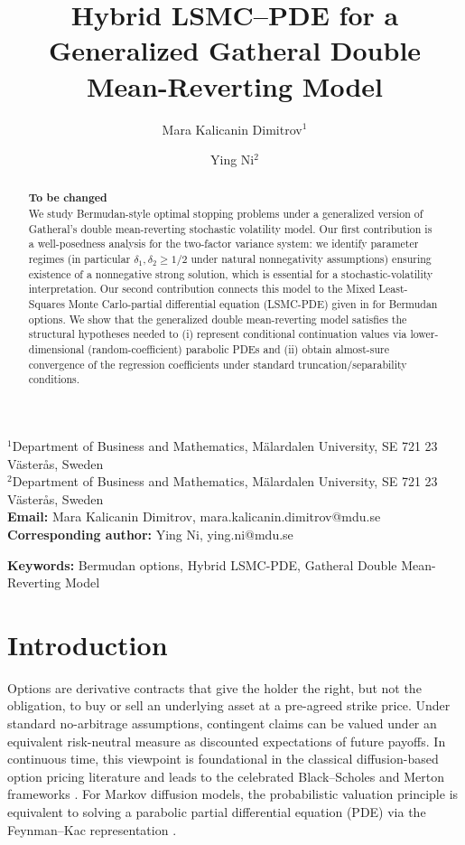 \documentclass[10pt]{article}
\title{Hybrid LSMC--PDE for a Generalized Gatheral Double Mean-Reverting Model}
\author{%
Mara Kalicanin Dimitrov$^{1}$ \and
Ying Ni$^{2}$%
}
\date{}
\theoremstyle{plain}
\theoremstyle{definition}
\theoremstyle{remark}
\newcommand{\keywords}[1]{\par\noindent\textbf{Keywords:} #1\par}
\begin{document}
\maketitle

\begin{center}
\small
$^{1}$Department of Business and Mathematics, M\"{a}lardalen University, SE 721 23 V\"{a}ster{\aa}s, Sweden\\
$^{2}$Department of Business and Mathematics, M\"{a}lardalen University, SE 721 23 V\"{a}ster{\aa}s, Sweden\\[4pt]
\textbf{Email:} Mara Kalicanin Dimitrov, mara.kalicanin.dimitrov@mdu.se\\
\textbf{Corresponding author:} Ying Ni, ying.ni@mdu.se\\
\end{center}

\begin{abstract}
\textbf{To be changed}\\
We study Bermudan-style optimal stopping problems under a generalized version of Gatheral's
double mean-reverting stochastic volatility model. Our first contribution is a well-posedness analysis for the
two-factor variance system: we identify parameter regimes (in particular $\delta_1,\delta_2\ge 1/2$
under natural nonnegativity assumptions) ensuring existence of a nonnegative strong solution,
which is essential for a stochastic-volatility interpretation.
Our second contribution connects this model to the Mixed Least-Squares Monte Carlo-partial
differential equation (LSMC-PDE) given in \citet{farahany2020mixing} for Bermudan
options. We show that the generalized double
mean-reverting model satisfies the structural hypotheses needed to (i) represent conditional
continuation values via lower-dimensional (random-coefficient) parabolic PDEs and (ii) obtain
almost-sure convergence of the regression coefficients under standard truncation/separability
conditions.
\end{abstract}

\keywords{Bermudan options, Hybrid LSMC-PDE, Gatheral Double Mean-Reverting Model}


\section{Introduction}

Options are derivative contracts that give the holder the right, but not the obligation, to buy or sell an underlying asset at a pre-agreed strike price.
Under standard no-arbitrage assumptions, contingent claims can be valued under an equivalent risk-neutral measure as discounted expectations of future payoffs.
In continuous time, this viewpoint is foundational in the classical diffusion-based option pricing literature and leads to the celebrated Black--Scholes and Merton frameworks \citep{black1973pricing,merton1973theory}.
For Markov diffusion models, the probabilistic valuation principle is equivalent to solving a parabolic partial differential equation (PDE) via the Feynman--Kac representation \citep{karatzas1991brownian}.
\end{document}
